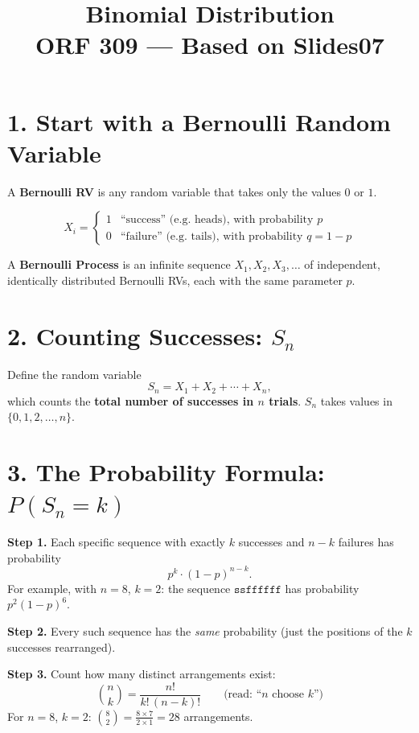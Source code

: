 \documentclass[12pt]{article}
\title{Binomial Distribution\\{\large ORF 309 --- Based on Slides07}}
\author{}
\date{}
\begin{document}
\maketitle

\section*{1. Start with a Bernoulli Random Variable}

A \textbf{Bernoulli RV} is any random variable that takes only the values $0$ or $1$.

\[
X_i = \begin{cases} 1 & \text{``success'' (e.g.\ heads), with probability } p \\ 0 & \text{``failure'' (e.g.\ tails), with probability } q = 1 - p \end{cases}
\]

A \textbf{Bernoulli Process} is an infinite sequence $X_1, X_2, X_3, \ldots$ of independent, identically distributed Bernoulli RVs, each with the same parameter $p$.

\section*{2. Counting Successes: $S_n$}

Define the random variable
\[
S_n = X_1 + X_2 + \cdots + X_n,
\]
which counts the \textbf{total number of successes in $n$ trials}. $S_n$ takes values in $\{0, 1, 2, \ldots, n\}$.

\section*{3. The Probability Formula: $P(S_n = k)$}

\textbf{Step 1.} Each specific sequence with exactly $k$ successes and $n - k$ failures has probability
\[
p^k \cdot (1-p)^{n-k}.
\]
For example, with $n = 8$, $k = 2$: the sequence $\mathtt{ssffffff}$ has probability $p^2(1-p)^6$.

\textbf{Step 2.} Every such sequence has the \emph{same} probability (just the positions of the $k$ successes rearranged).

\textbf{Step 3.} Count how many distinct arrangements exist:
\[
\binom{n}{k} = \frac{n!}{k!\,(n-k)!}
\qquad \text{(read: ``$n$ choose $k$'')}
\]
For $n=8$, $k=2$: $\binom{8}{2} = \frac{8 \times 7}{2 \times 1} = 28$ arrangements.
\end{document}
